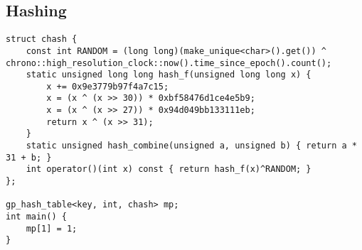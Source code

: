 \documentclass[landscape, 8pt, a4paper, oneside, twocolumn]{extarticle}
\begin{document}
\subsection {Hashing}
\begin{verbatim}
struct chash {
	const int RANDOM = (long long)(make_unique<char>().get()) ^ chrono::high_resolution_clock::now().time_since_epoch().count();
	static unsigned long long hash_f(unsigned long long x) {
		x += 0x9e3779b97f4a7c15;
		x = (x ^ (x >> 30)) * 0xbf58476d1ce4e5b9;
		x = (x ^ (x >> 27)) * 0x94d049bb133111eb;
		return x ^ (x >> 31);
	}
	static unsigned hash_combine(unsigned a, unsigned b) { return a * 31 + b; }
	int operator()(int x) const { return hash_f(x)^RANDOM; }
};

gp_hash_table<key, int, chash> mp;
int main() {
	mp[1] = 1;
}
\end{verbatim}
\end{document}
